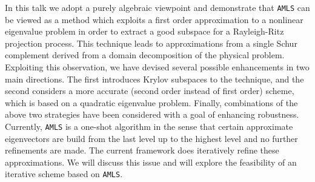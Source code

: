 \documentclass{report}
\begin{document}
In this talk we adopt a purely algebraic viewpoint and demonstrate that
{\tt AMLS} can be viewed as a method which exploits a first order
approximation to a nonlinear eigenvalue problem in order to extract a
good subspace for a Rayleigh-Ritz projection process. This technique
leads to approximations from a single Schur complement derived from a
domain decomposition of the physical problem. Exploiting this
observation, we have devised several possible enhancements in two main
directions. The first introduces Krylov subspaces to the technique, and
the second considers a more accurate (second order instead of first
order) scheme, which is based on a quadratic eigenvalue problem. Finally,
combinations of the above two strategies have been considered with a goal
of enhancing robustness.
Currently, {\tt AMLS} is a one-shot algorithm in the sense that certain
approximate eigenvectors are build from the last level up to the highest
level and no further refinements are made. The current framework does
iteratively refine these approximations. We will
discuss this issue and will explore the feasibility of an iterative
scheme based on {\tt AMLS}.
\end{document}
